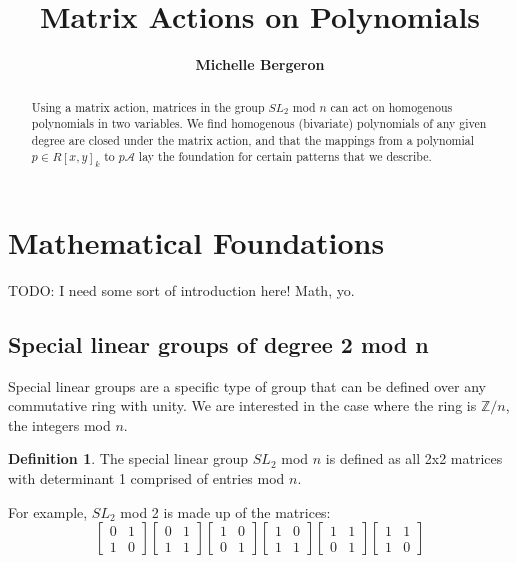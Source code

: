 \documentclass[a4paper,draft]{amsproc}
\title[Matrix Actions]{Matrix Actions on Polynomials}
\author[Bergeron]{\bfseries Michelle Bergeron}
\theoremstyle{plain}
\theoremstyle{definition}
\newtheorem{dfn}{Definition}[section]
\theoremstyle{remark}
\numberwithin{equation}{section}
\begin{document}
\vspace{18mm} \setcounter{page}{1} \thispagestyle{empty}


\begin{abstract}
Using a matrix action, matrices in the group $SL_{2}$ mod $n$ can act on homogenous polynomials in two variables. We find homogenous (bivariate) polynomials of any given degree are closed under the matrix action, and that the mappings from a polynomial $p \in R[x,y]_{k}$ to  $p\mathcal{A}$ lay the foundation for certain patterns that we describe. 
\end{abstract}

\maketitle

\section{Mathematical Foundations} 

TODO: I need some sort of introduction here! Math, yo. 

\subsection{Special linear groups of degree 2 mod n}
Special linear groups are a specific type of group that can be defined over any commutative ring with unity. We are interested in the case where the ring is $\mathbb{Z}/n$, the integers mod $n$. 
\begin{dfn}
The special linear group $SL_{2}$ mod $n$ is defined as all 2x2 matrices with determinant 1 comprised of entries mod $n$.
\end{dfn}

For example, $SL_{2}$ mod 2 is made up of the matrices:
$$
\begin{bmatrix}
 0&1 \\ 
 1&0 
\end{bmatrix}
\begin{bmatrix}
 0&1 \\ 
 1&1 
\end{bmatrix}
\begin{bmatrix}
 1&0 \\ 
 0&1 
\end{bmatrix}
\begin{bmatrix}
 1&0 \\ 
 1&1 
\end{bmatrix}
\begin{bmatrix}
 1&1 \\ 
 0&1 
\end{bmatrix}
\begin{bmatrix}
 1&1 \\ 
 1&0 
\end{bmatrix}
$$
\end{document}
